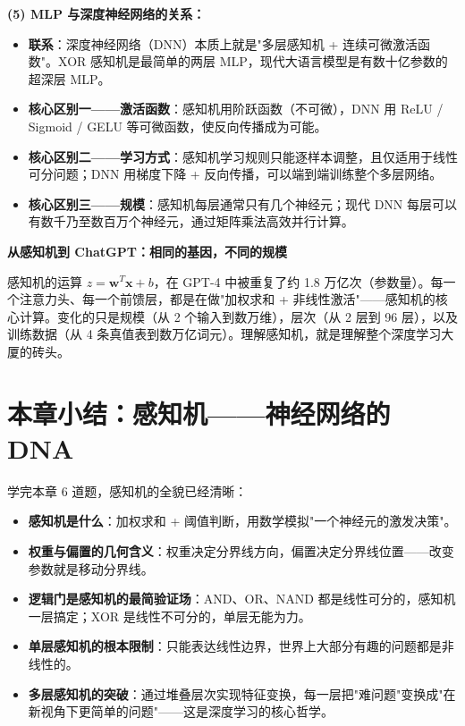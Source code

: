\documentclass[a4paper,11pt]{ctexart}
\begin{document}
\begin{solutionbox}[参考答案与详细解析]
    \textbf{(5) MLP 与深度神经网络的关系：}

    \begin{keybox}
        \begin{itemize}
            \item \textbf{联系}：深度神经网络（DNN）本质上就是"多层感知机 + 连续可微激活函数"。XOR 感知机是最简单的两层 MLP，现代大语言模型是有数十亿参数的超深层 MLP。
            \item \textbf{核心区别一——激活函数}：感知机用阶跃函数（不可微），DNN 用 ReLU / Sigmoid / GELU 等可微函数，使反向传播成为可能。
            \item \textbf{核心区别二——学习方式}：感知机学习规则只能逐样本调整，且仅适用于线性可分问题；DNN 用梯度下降 + 反向传播，可以端到端训练整个多层网络。
            \item \textbf{核心区别三——规模}：感知机每层通常只有几个神经元；现代 DNN 每层可以有数千乃至数百万个神经元，通过矩阵乘法高效并行计算。
        \end{itemize}
    \end{keybox}
\end{solutionbox}

\begin{appbox}[现实应用场景]
    \textbf{从感知机到 ChatGPT：相同的基因，不同的规模}

    感知机的运算 $z = \mathbf{w}^T \mathbf{x} + b$，在 GPT-4 中被重复了约 1.8 万亿次（参数量）。每一个注意力头、每一个前馈层，都是在做"加权求和 + 非线性激活"——感知机的核心计算。变化的只是规模（从 2 个输入到数万维），层次（从 2 层到 96 层），以及训练数据（从 4 条真值表到数万亿词元）。理解感知机，就是理解整个深度学习大厦的砖头。
\end{appbox}


\section{本章小结：感知机——神经网络的 DNA}

学完本章 6 道题，感知机的全貌已经清晰：

\begin{itemize}
    \item \textbf{感知机是什么}：加权求和 + 阈值判断，用数学模拟"一个神经元的激发决策"。
    \item \textbf{权重与偏置的几何含义}：权重决定分界线方向，偏置决定分界线位置——改变参数就是移动分界线。
    \item \textbf{逻辑门是感知机的最简验证场}：AND、OR、NAND 都是线性可分的，感知机一层搞定；XOR 是线性不可分的，单层无能为力。
    \item \textbf{单层感知机的根本限制}：只能表达线性边界，世界上大部分有趣的问题都是非线性的。
    \item \textbf{多层感知机的突破}：通过堆叠层次实现特征变换，每一层把"难问题"变换成"在新视角下更简单的问题"——这是深度学习的核心哲学。
\end{itemize}
\end{document}
